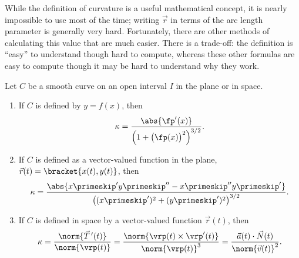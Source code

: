 While the definition of curvature is a useful mathematical concept, it is nearly impossible to use most of the time; writing $\vec r$ in terms of the arc length parameter is generally very hard. Fortunately, there are other methods of calculating this value that are much easier. There is a trade-off: the definition is ``easy\primeskip'' to understand though hard to compute, whereas these other formulas are easy to compute though it may be hard to understand why they work.

\begin{theorem}\label{thm:curvature_formulas}
Let $C$ be a smooth curve on an open interval $I$ in the plane or in space.
\begin{enumerate}
	\item If $C$ is defined by $y=f(x)$, then 
	\[\kappa = \frac{\abs{\fp'(x)}}{\Big(1+\big(\fp(x)\big)^2\Big)^{3/2}}.\]
	\item	If $C$ is defined as a vector-valued function in the plane, $\vec r(t) =\bracket{x(t), y(t)}$, then
	\[\kappa = \frac{\abs{x\primeskip'y\primeskip''-x\primeskip''y\primeskip'}}{\big((x\primeskip')^2+(y\primeskip')^2\big)^{3/2}}.\]
	\item If $C$ is defined in space by a vector-valued function $\vec r(t)$, then
\[\kappa = \frac{\norm{\vec T\,'(t)}}{\norm{\vrp(t)}} = \frac{\norm{\vrp(t)\times\vrp'(t)}}{\norm{\vrp(t)}^3} = \frac{\vec a(t)\cdot \vec N(t)}{\norm{\vec v(t)}^2}.\]
\end{enumerate}
\end{theorem}


